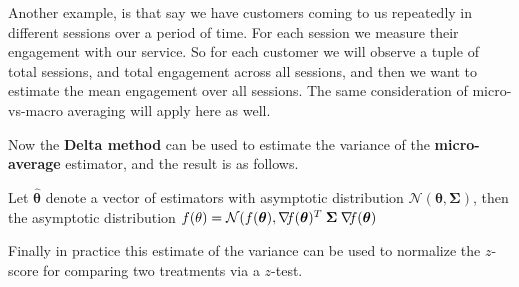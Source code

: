 \documentclass[preview,border={30 30 30 30}]{standalone}
\begin{document}
Another example, is that say we have customers coming to us repeatedly in different sessions over a period of time. For each session we measure their engagement with our service. So for each customer we will observe a tuple of total sessions, and total engagement across all sessions, and then we want to estimate the mean engagement over all sessions. The same consideration of micro-vs-macro averaging will apply here as well.

Now the \textbf{Delta method} can be used to estimate the variance of the \textbf{micro-average} estimator, and the result is as follows.

Let $\hat{\boldsymbol\theta}$ denote a vector of estimators with asymptotic distribution $\mathcal{N}(\boldsymbol\theta, \boldsymbol\Sigma)$, then the asymptotic distribution $f(\theta) = \mathcal{N}(f(\boldsymbol\theta), {\nabla}\kern-0.25em f (\boldsymbol\theta)^T \kern0.25em \boldsymbol\Sigma \kern0.25em{\nabla}\kern-0.25em f (\boldsymbol\theta)$

Finally in practice this estimate of the variance can be used to normalize the $z$-score for comparing two treatments via a $z$-test.  
\end{document}
